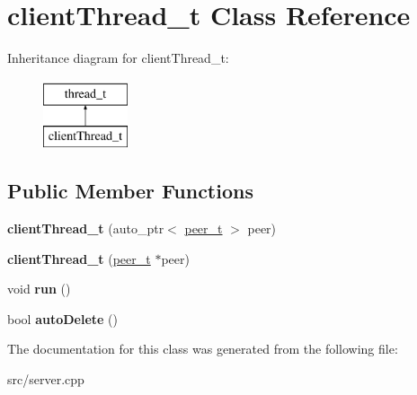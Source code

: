 \hypertarget{classclientThread__t}{\section{client\-Thread\-\_\-t \-Class \-Reference}
\label{classclientThread__t}
}
\-Inheritance diagram for client\-Thread\-\_\-t\-:\begin{figure}[H]
\begin{center}
\leavevmode
\includegraphics[height=2.000000cm]{classclientThread__t}
\end{center}
\end{figure}
\subsection*{\-Public \-Member \-Functions}
\begin{DoxyCompactItemize}
\item 
\hypertarget{classclientThread__t_ac434076d879be5dab912424c5931ecb9}{{\bfseries client\-Thread\-\_\-t} (auto\-\_\-ptr$<$ \hyperlink{classpeer__t}{peer\-\_\-t} $>$ peer)}\label{classclientThread__t_ac434076d879be5dab912424c5931ecb9}

\item 
\hypertarget{classclientThread__t_a6ac69b8633adc304532b9085884348c1}{{\bfseries client\-Thread\-\_\-t} (\hyperlink{classpeer__t}{peer\-\_\-t} $\ast$peer)}\label{classclientThread__t_a6ac69b8633adc304532b9085884348c1}

\item 
\hypertarget{classclientThread__t_a6064fc73a5edc9d26ea0b8125146b2e1}{void {\bfseries run} ()}\label{classclientThread__t_a6064fc73a5edc9d26ea0b8125146b2e1}

\item 
\hypertarget{classclientThread__t_a815c51c18c2b3cf1a1da0ef3c4b341b0}{bool {\bfseries auto\-Delete} ()}\label{classclientThread__t_a815c51c18c2b3cf1a1da0ef3c4b341b0}

\end{DoxyCompactItemize}


\-The documentation for this class was generated from the following file\-:\begin{DoxyCompactItemize}
\item 
src/server.\-cpp\end{DoxyCompactItemize}

